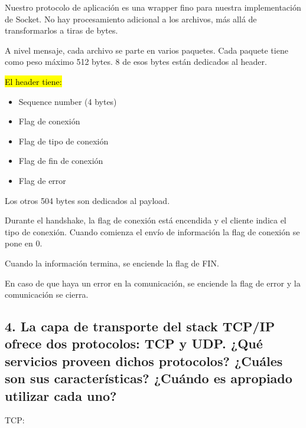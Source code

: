 \documentclass{article}
\begin{document}
Nuestro protocolo de aplicación es una wrapper fino para nuestra implementación de Socket. No hay procesamiento adicional a los archivos, más allá de transformarlos a tiras de bytes.

A nivel mensaje, cada archivo se parte en varios paquetes. Cada paquete tiene como peso máximo 512 bytes. 8 de esos bytes están dedicados al header.

\hl{El header tiene:}

\begin{itemize}
\item
  Sequence number (4 bytes)
\item
  Flag de conexión
\item
  Flag de tipo de conexión
\item
  Flag de fin de conexión
\item
  Flag de error
\end{itemize}

Los otros 504 bytes son dedicados al payload.

Durante el handshake, la flag de conexión está encendida y el cliente indica el tipo de conexión. Cuando comienza el envío de información la flag de conexión se pone en 0.

Cuando la información termina, se enciende la flag de FIN.

En caso de que haya un error en la comunicación, se enciende la flag de error y la comunicación se cierra.

\subsection{\texorpdfstring{\textbf{4. La capa de transporte del stack
TCP/IP ofrece dos protocolos: TCP y UDP. ¿Qué servicios proveen dichos
protocolos? ¿Cuáles son sus características? ¿Cuándo es apropiado
utilizar cada
uno?}}{4. La capa de transporte del stack TCP/IP ofrece dos protocolos: TCP y UDP. ¿Qué servicios proveen dichos protocolos? ¿Cuáles son sus características? ¿Cuándo es apropiado utilizar cada uno?}}\label{la-capa-de-transporte-del-stack-tcpip-ofrece-dos-protocolos-tcp-y-udp.-quuxe9-servicios-proveen-dichos-protocolos-cuuxe1les-son-sus-caracteruxedsticas-cuuxe1ndo-es-apropiado-utilizar-cada-uno}

TCP:
\end{document}
